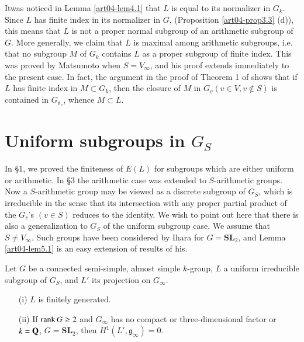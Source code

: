 \begin{remark}\label{art04-rem4.7}
It\pageoriginale was noticed in Lemma \ref{art04-lem4.1} that $L$ is equal to its normalizer in $G_{k}$. Since $L$ has finite index in its normalizer in $G$, (Proposition \ref{art04-prop3.3} (d)), this means that $L$ is not a proper normal subgroup of an arithmetic subgroup of $G$. More generally, we claim that $L$ is maximal among arithmetic subgroups, i.e. that no subgroup $M$ of $G_{k}$ contains $L$ as a proper subgroup of finite index. This was proved by Matsumoto \cite{art04-key23} when $S=V_{\infty}$, and his proof extends immediately to the present case. In fact, the argument in the proof of Theorem 1 of \cite{art04-key23} shows that if $L$ has finite index in $M\subset G_{k}$, then the closure of $M$ in $G_{v}(v\in V, v\not\in S)$ is contained in $G_{\mathfrak{o}_{v}}$, whence $M\subset L$.
\end{remark}

\section{Uniform subgroups in \texorpdfstring{$G_{S}$}{Gs}}\label{art04-sec5}

In \S1, we proved the finiteness of $E(L)$ for subgroups which are either uniform or arithmetic. In \S3 the arithmetic case was extended to $S$-arithmetic groups. Now a $S$-arithmetic group may be viewed as a discrete subgroup of $G_{S}$, which is irreducible in the sense that its intersection with any proper partial product of the $G_{v}$'s $(v\in S)$ reduces to the identity. We wish to point out here that there is also a generalization to $G_{S}$ of the uniform subgroup case. We assume that $S\neq V_{\infty}$. Such groups have been considered by Ihara \cite{art04-key14} for $G=\mathbf{SL}_{2}$, and Lemma \ref{art04-lem5.1} is an easy extension of results of his.

\begin{lemma}\label{art04-lem5.1}
Let $G$ be a connected semi-simple, almost simple $k$-group, $L$ a uniform irreducible subgroup of $G_{S}$, and $L'$ its projection on $G_{\infty}$.
\begin{itemize}
\item[{\rm(i)}] $L$ is finitely generated.

\item[{\rm(ii)}] If $\operatorname{\mathrm{rank}} G\geq 2$ and $G_{\infty}$ has no compact or three-dimensional factor or $k=\mathbf{Q}$, $G=\mathbf{SL}_{2}$, then $H^{1}(L',\mathfrak{g}_{\infty})=0$.
\end{itemize}
\end{lemma}

